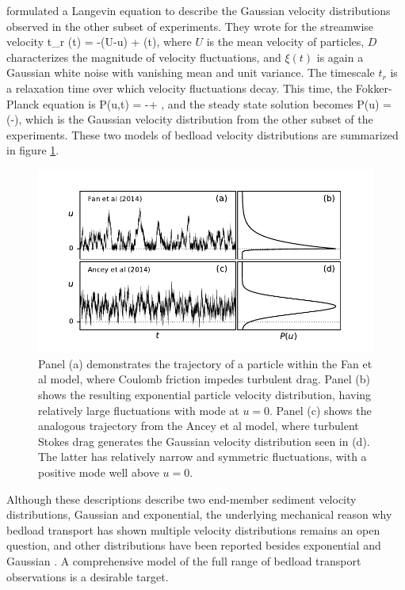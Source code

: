 \citet{Ancey2014} formulated a Langevin equation to describe the Gaussian velocity distributions observed in the other subset of experiments. They wrote for the streamwise velocity 
\be t_r (t) = -(U-u) + \xi(t),\ee
where $U$ is the mean velocity of particles, $D$ characterizes the magnitude of velocity fluctuations, and $\xi(t)$ is again a Gaussian white noise with vanishing mean and unit variance. The timescale $t_r$ is a relaxation time over which velocity fluctuations decay. This time, the Fokker-Planck equation is
\be {} P(u,t) = - + ,\ee 
and the steady state solution becomes
\be P(u) =  \exp\Big(-\Big), \ee
which is the Gaussian velocity distribution from the other subset of the experiments.
These two models of bedload velocity distributions are summarized in figure \ref{fig:fanAncey}.
\begin{figure}[!htbp]
	\includegraphics[width=\linewidth,keepaspectratio]{./figures/ch1/fanAncey.pdf}
	\caption{Panel (a) demonstrates the trajectory of a particle within the Fan et al model, where Coulomb friction impedes turbulent drag. Panel (b) shows the resulting exponential particle velocity distribution, having relatively large fluctuations with mode at $u=0$.
	Panel (c) shows the analogous trajectory from the Ancey et al model, where turbulent Stokes drag generates the Gaussian velocity distribution seen in (d). The latter has relatively narrow and symmetric fluctuations, with a positive mode well above $u=0$.}
	\label{fig:fanAncey}
\end{figure}
Although these descriptions describe two end-member sediment velocity distributions, Gaussian and exponential, the underlying mechanical reason why bedload transport has shown multiple velocity distributions remains an open question, and other distributions have been reported besides exponential and Gaussian \citep[e.g.][]{Houssais2012,Liu2019}.
A comprehensive model of the full range of bedload transport observations is a desirable target.

